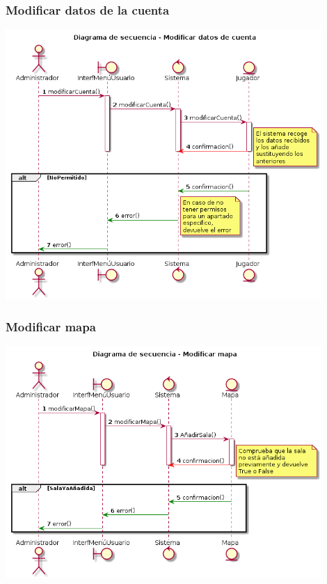 \subsubsection{Modificar datos de la cuenta}
\begin{center}
  \includegraphics[width=0.9\textwidth]{./imatges/administrador/Modificar_datos_de_cuenta.png}
  \end{center}
  
\subsubsection{Modificar mapa}
\begin{center}
  \includegraphics[width=0.9\textwidth]{./imatges/administrador/Modificar_mapa.png}
  \end{center}
  

